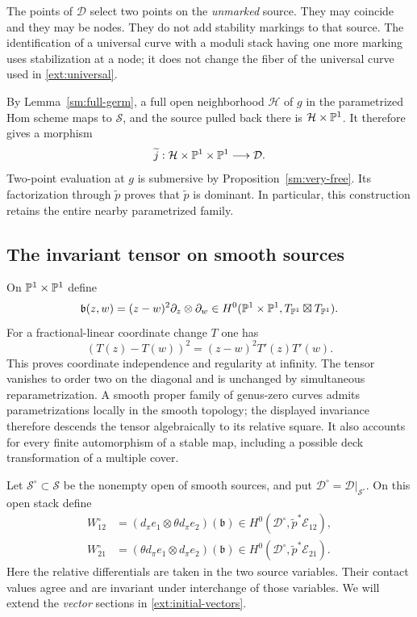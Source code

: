 The points of $\mathcal D$ select two points on the \emph{unmarked}
source. They may coincide and they may be nodes. They do not add
stability markings to that source. The identification of a universal
curve with a moduli stack having one more marking uses stabilization
at a node; it does not change the fiber of the universal curve used
in \eqref{ext:universal}.

By Lemma~\ref{sm:full-germ}, a full open neighborhood $\mathcal H$ of
$g$ in the parametrized Hom scheme maps to $\mathcal S$, and the
source pulled back there is $\mathcal H\times\mathbb P^1$. It therefore
gives a morphism
\begin{equation}\label{ext:hom-to-stack}
\widetilde j:\mathcal H\times\mathbb P^1\times\mathbb P^1
\longrightarrow\mathcal D.
\end{equation}
Two-point evaluation at $g$ is submersive by
Proposition~\ref{sm:very-free}. Its factorization through
$\widetilde p$ proves that $\widetilde p$ is dominant. In particular,
this construction retains the entire nearby parametrized family.

\subsection{The invariant tensor on smooth sources}

On $\mathbb P^1\times\mathbb P^1$ define
\begin{equation}\label{ext:bivector}
\mathfrak b(z,w)=(z-w)^2\partial_z\otimes\partial_w
\in H^0(\mathbb P^1\times\mathbb P^1,T_{\mathbb P^1}\boxtimes T_{\mathbb P^1}).
\end{equation}
For a fractional-linear coordinate change $T$ one has
\[
(T(z)-T(w))^2=(z-w)^2T'(z)T'(w).
\]
This proves coordinate independence and regularity at infinity.
The tensor vanishes to order two on the diagonal and is unchanged
by simultaneous reparametrization. A smooth proper family of
genus-zero curves admits parametrizations locally in the smooth
topology; the displayed invariance therefore descends the tensor
algebraically to its relative square. It also accounts for every
finite automorphism of a stable map, including a possible deck
transformation of a multiple cover.

Let $\mathcal S^\circ\subset\mathcal S$ be the nonempty open of smooth
sources, and put $\mathcal D^\circ=\mathcal D|_{\mathcal S^\circ}$.
On this open stack define
\begin{equation}\label{ext:initial-vectors}
\begin{aligned}
W_{12}^{\circ}
  &=(d_\pi e_1\otimes\theta d_\pi e_2)(\mathfrak b)
    \in H^0(\mathcal D^\circ,\widetilde p^*\mathcal E_{12}),\\
W_{21}^{\circ}
  &=(\theta d_\pi e_1\otimes d_\pi e_2)(\mathfrak b)
    \in H^0(\mathcal D^\circ,\widetilde p^*\mathcal E_{21}).
\end{aligned}
\end{equation}
Here the relative differentials are taken in the two source
variables. Their contact values agree and are invariant under
interchange of those variables. We will extend the \emph{vector}
sections in \eqref{ext:initial-vectors}.

